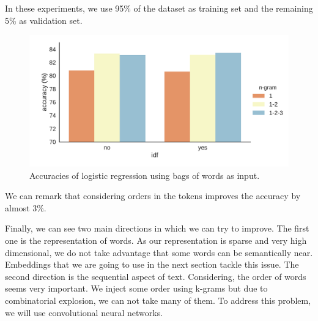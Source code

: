 \documentclass[10pt,conference,compsocconf,retainorgcmds]{IEEEtran}
\begin{document}
In these experiments, we use 95\% of the dataset as training set and the remaining 5\% as validation set.
\begin{figure}
    \centering
    \includegraphics[width=\linewidth]{imag/idf.pdf}
    \caption{Accuracies of logistic regression using bags of words as input.}
    \label{fig:my_label}
\end{figure}

We can remark that considering orders in the tokens improves the accuracy by almost 3\%.

Finally, we can see two main directions in which we can try to improve. The first one is the representation of words. As our representation is sparse and very high dimensional, we do not take advantage that some words can be semantically near. Embeddings that we are going to use in the next section tackle this issue. The second direction is the sequential aspect of text. Considering, the order of words seems very important. We inject some order using k-grams but due to combinatorial explosion, we can not take many of them. To address this problem, we will use convolutional neural networks.
\end{document}
